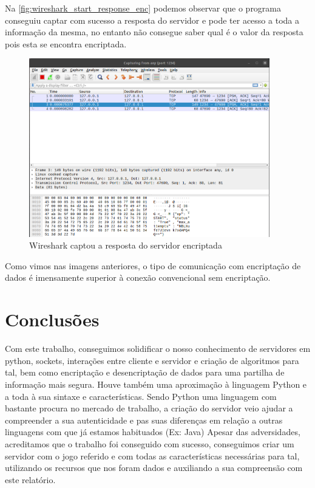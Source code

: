 \documentclass{report}
\begin{document}
Na \autoref{fig:wireshark_start_response_enc} podemos observar que o programa conseguiu captar com sucesso a resposta do servidor e pode ter acesso a toda a informação da mesma, no entanto não consegue saber qual é o valor da resposta pois esta se encontra encriptada.

\begin{figure}[!h]
\center 
\includegraphics[height=220pt]{img/encripted/wireshark_start_response.png}
\caption{Wireshark captou a resposta do servidor encriptada}
\label{fig:wireshark_start_response_enc}
\end{figure}

Como vimos nas imagens anteriores, o tipo de comunicação com encriptação de dados é imensamente superior à conexão convencional sem encriptação.


\chapter{Conclusões}
\label{chap.conclusao}
Com este trabalho, conseguimos solidificar o nosso conhecimento de servidores em python, sockets, interações entre 
cliente e servidor e criação de algoritmos para tal, bem como encriptação e desencriptação de dados para uma partilha
de informação mais segura. Houve também uma aproximação à linguagem Python e a toda à sua sintaxe e características.
Sendo Python uma linguagem com bastante procura no mercado de trabalho, a criação do servidor veio ajudar a compreender
a sua autenticidade e pas suas diferenças em relação a outras linguagens com que já estamos habituados (Ex: Java)
Apesar das adversidades, acreditamos que o trabalho foi conseguido com sucesso, conseguimos criar um servidor 
com o jogo referido e com todas as características necessárias para tal, utilizando os recursos que nos foram dados
e auxiliando a sua compreensão com este relatório.
\end{document}
